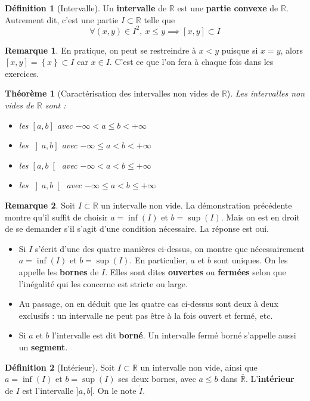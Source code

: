 \documentclass[french]{book}
\newcommand{\R}{\mathbb{R}}
\theoremstyle{plain}
\newtheorem{thm}{Théorème}[chapter]
\theoremstyle{definition}
\newtheorem{dfn}{Définition}[chapter]
\newtheorem{rmq}{Remarque}[chapter]
\theoremstyle{remark}
\begin{document}
\begin{dfn}[Intervalle]
	Un \textbf{intervalle} de $\R$ est une \textbf{partie convexe} de $\R$. Autrement dit, c'est une partie $I\subset\R$ telle que $$\forall (x,y)\in I^2,\ x\leqslant y\implies \left[x,y\right]\subset I$$
\end{dfn}
\begin{rmq}
	En pratique, on peut se restreindre à $x<y$ puisque si $x=y$, alors $\left[x,y\right]=\left\{x\right\}\subset I$ car $x\in I$. C'est ce que l'on fera à chaque fois dans les exercices.
\end{rmq}
\begin{thm}[Caractérisation des intervalles non vides de $\R$]
	Les intervalles non vides de $\R$ sont :
	\begin{itemize}
		\item les $\left[a,b\right]$ avec $-\infty<a\leqslant b<+\infty$
		\item les $\left]a,b\right]$ avec $-\infty\leqslant a<b<+\infty$
		\item les $\left[a,b\right[$ avec $-\infty<a<b\leqslant+\infty$
		\item les $\left]a,b\right[$ avec $-\infty\leqslant a< b\leqslant+\infty$
	\end{itemize}
\end{thm}
\begin{rmq}
	Soit $I\subset\R$ un intervalle non vide. La démonstration précédente montre qu'il suffit de choisir $a=\inf(I)$ et $b=\sup(I)$. Mais on est en droit de se demander s'il s'agit d'une condition nécessaire. La réponse est oui.
	\begin{itemize}
		\item Si $I$ s'écrit d'une des quatre manières ci-dessus, on montre que nécessairement $a=\inf(I)$ et $b=\sup(I)$. En particulier, $a$ et $b$ sont uniques. On les appelle les \textbf{bornes} de $I$. Elles sont dites \textbf{ouvertes} ou \textbf{fermées} selon que l'inégalité qui les concerne est stricte ou large.
		\item Au passage, on en déduit que les quatre cas ci-dessus sont deux à deux exclusifs : un intervalle ne peut pas être à la fois ouvert et fermé, etc.
		\item Si $a$ et $b$ l'intervalle est dit \textbf{borné}. Un intervalle fermé borné s'appelle aussi un \textbf{segment}.
	\end{itemize}
\end{rmq}
\begin{dfn}[Intérieur]
	Soit $I\subset\R$ un intervalle non vide, ainsi que $a=\inf(I)$ et $b=\sup(I)$ ses deux bornes, avec $a\leqslant b$ dans $\overline{\R}$. L'\textbf{intérieur} de $I$ est l'intervalle $]a,b[$. On le note $\mathring{I}$.
\end{dfn}
\end{document}
